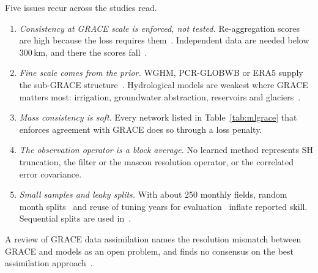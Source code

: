 Five issues recur across the studies read.
\begin{enumerate}
  \item \emph{Consistency at GRACE scale is enforced, not tested.} Re-aggregation scores are high because the loss requires them~\cite{goracci2026nggm,zhang2026groundwater}. Independent data are needed below 300\,km, and there the scores fall~\cite{zhang2026groundwater,li2026physically}.
  \item \emph{Fine scale comes from the prior.} WGHM, PCR-GLOBWB or ERA5 supply the sub-GRACE structure~\cite{gou2024global,uz2026dynamic,li2026physically,xiong2026sysu}. Hydrological models are weakest where GRACE matters most: irrigation, groundwater abstraction, reservoirs and glaciers~\cite{springer2026review}.
  \item \emph{Mass consistency is soft.} Every network listed in Table~\ref{tab:mlgrace} that enforces agreement with GRACE does so through a loss penalty.
  \item \emph{The observation operator is a block average.} No learned method represents SH truncation, the filter or the mascon resolution operator, or the correlated error covariance.
  \item \emph{Small samples and leaky splits.} With about 250 monthly fields, random month splits~\cite{yin2023gtwsmlrec,uz2024highres} and reuse of tuning years for evaluation~\cite{dombos2026dshift} inflate reported skill. Sequential splits are used in~\cite{arzoumanidis2026stgnn,lu2024changes,steidl2026hignn}.
\end{enumerate}
A review of GRACE data assimilation names the resolution mismatch between GRACE and models as an open problem, and finds no consensus on the best assimilation approach~\cite{springer2026review}.
